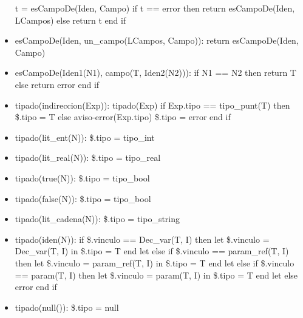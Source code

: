 \documentclass[11pt]{article}
\begin{document}
\begin{itemize}
                \subitem t = esCampoDe(Iden, Campo) 
                \subitem if t == error then
                    \subsubitem return esCampoDe(Iden, LCampos)
                \subitem else 
                    \subsubitem return t
                \subitem end if
            \item esCampoDe(Iden, un\_campo(LCampos, Campo)): 
                \subitem return esCampoDe(Iden, Campo)
            \item esCampoDe(Iden1(N1), campo(T, Iden2(N2))): 
                \subitem if N1 == N2 then
                    \subsubitem return T
                \subitem else 
                    \subsubitem return error
                \subitem end if
            \item tipado(indireccion(Exp)): 
                \subitem tipado(Exp) 
                \subitem if Exp.tipo == tipo\_punt(T) then
                    \subsubitem \$.tipo = T
                \subitem else 
                    \subsubitem aviso-error(Exp.tipo)
                    \subsubitem \$.tipo = error
                \subitem end if
            \item tipado(lit\_ent(N)): 
                \subitem \$.tipo = tipo\_int
            \item tipado(lit\_real(N)): 
                \subitem \$.tipo = tipo\_real
            \item tipado(true(N)): 
                \subitem \$.tipo = tipo\_bool
            \item tipado(false(N)): 
                \subitem \$.tipo = tipo\_bool
            \item tipado(lit\_cadena(N)): 
                \subitem \$.tipo = tipo\_string
            \item tipado(iden(N)): 
                \subitem if \$.vinculo == Dec\_var(T, I) then
                    \subsubitem let \$.vinculo = Dec\_var(T, I) in 
                        \subsubitem \hspace{2em} \$.tipo = T
                    \subsubitem end let
                \subitem else if \$.vinculo == param\_ref(T, I) then
                    \subsubitem let \$.vinculo = param\_ref(T, I) in 
                        \subsubitem \hspace{2em} \$.tipo = T
                    \subsubitem end let
                \subitem else if \$.vinculo == param(T, I) then
                    \subsubitem let \$.vinculo = param(T, I) in 
                        \subsubitem \hspace{2em} \$.tipo = T
                    \subsubitem end let
                \subitem else
                    \subsubitem error
                \subitem end if
            \item tipado(null()): 
                \subitem \$.tipo = null
        \end{itemize}
\end{document}

